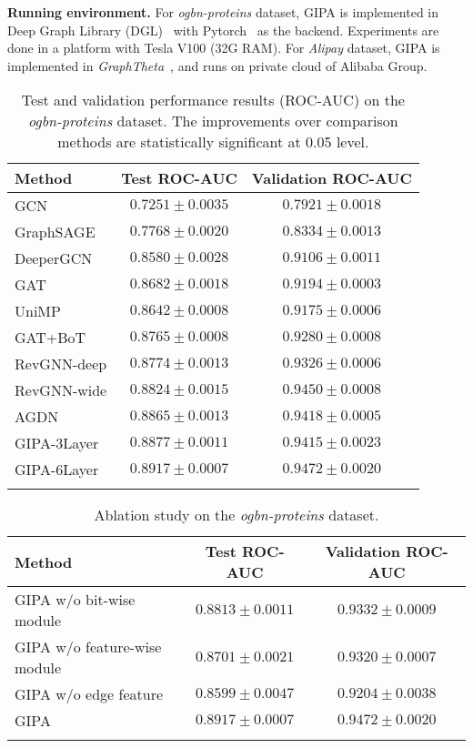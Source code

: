 \documentclass[runningheads]{llncs}
\newcommand{\model}{GIPA\xspace}
\begin{document}
\noindent \textbf{Running environment.} For \textit{ogbn-proteins} dataset, \model is implemented in Deep Graph Library (DGL)~\cite{wang2019deep} with Pytorch~\cite{paszke2019pytorch} as the backend. Experiments are done in a platform with Tesla V100 (32G RAM). For \textit{Alipay} dataset, \model is implemented in \textit{GraphTheta}~\cite{graphtheta}, and runs on private cloud of Alibaba Group.


\begin{table}[!h]
\centering
\caption{Test and validation performance results (ROC-AUC) on the \textit{ogbn-proteins} dataset. The improvements over comparison methods are statistically significant at 0.05 level.}
\begin{tabular}{lcc}
\hline
Method              & Test ROC-AUC  & Validation ROC-AUC \\ \hline
GCN                 & $0.7251\pm0.0035$ & $0.7921\pm0.0018$      \\
GraphSAGE           & $0.7768\pm0.0020$ & $0.8334\pm0.0013$      \\
DeeperGCN           & $0.8580\pm0.0028$ & $0.9106\pm0.0011$      \\
GAT                 & $0.8682\pm0.0018$ & $0.9194\pm0.0003$      \\
UniMP               & $0.8642\pm0.0008$ & $0.9175\pm0.0006$      \\
GAT+BoT  & $0.8765\pm0.0008$ & $0.9280\pm0.0008$      \\
RevGNN-deep & $0.8774\pm0.0013$ & $0.9326\pm0.0006$      \\
RevGNN-wide & $0.8824\pm0.0015$ & $0.9450\pm0.0008$      \\
AGDN & $0.8865\pm0.0013$ & $0.9418\pm0.0005$      \\
\hline
\model-3Layer & $0.8877\pm  0.0011$ & $0.9415\pm0.0023 $      \\
\model-6Layer      & $\mathbf{0.8917\pm 0.0007}$ & $\mathbf{0.9472\pm0.0020}$      \\ \hline
\label{tab:performance}
\end{tabular}
\vspace{-0.7cm}
\end{table}
\begin{table}[!h]
\centering
\caption{Ablation study on the \textit{ogbn-proteins} dataset.}
\begin{tabular}{lcc}
\hline
Method              & Test ROC-AUC  & Validation ROC-AUC \\ \hline
\model w/o bit-wise module                 & $0.8813\pm0.0011$ & $0.9332\pm0.0009$      \\
\model w/o feature-wise module         & $0.8701\pm0.0021$ & $0.9320\pm0.0007$      \\
\model w/o edge feature           & $0.8599\pm0.0047$ & $0.9204\pm0.0038$      \\
\hline
\model         & $\mathbf{0.8917\pm 0.0007}$ & $\mathbf{0.9472\pm0.0020}$      \\ \hline
\label{tab:ab_performance}
\end{tabular}
\vspace{-0.3cm}
\end{table}
\end{document}

